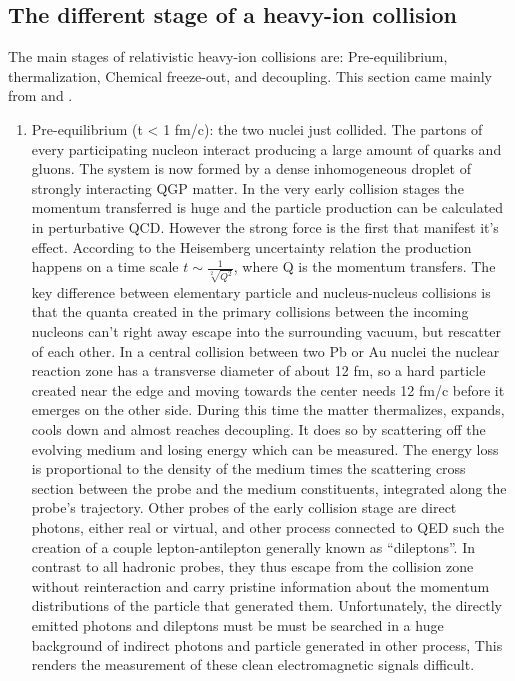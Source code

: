 \documentclass[12pt,a4paper]{book}
\begin{document}
	\subsection{The different stage of a heavy-ion collision}
	The main stages of relativistic heavy-ion collisions are: Pre-equilibrium, thermalization, Chemical freeze-out, and	decoupling. This section came mainly from \cite{heinz2004conceptsheavyionphysics} and \cite{amsdottorato9036}.
	\begin{enumerate}
		\item Pre-equilibrium (t < 1 fm/c): the two nuclei just collided. The partons of every participating nucleon interact producing a large amount of quarks and gluons. The system is now formed by a dense inhomogeneous droplet of strongly interacting QGP matter. In the very early collision stages the momentum transferred is huge and the particle production can be calculated in perturbative QCD. However the strong force is the first that manifest it's effect. According to the Heisemberg uncertainty relation the production happens on a time scale $t \sim \frac{1}{\sqrt[2]{Q^2}}$, where Q is the momentum transfers. The key difference between elementary particle and nucleus-nucleus collisions is that the quanta created in the primary collisions between the incoming nucleons can’t right away escape into the surrounding vacuum, but rescatter of each other. In a central collision between two Pb or Au nuclei the nuclear reaction zone has a transverse diameter of about 12 fm, so a hard particle created near the edge and moving towards the center needs 12 fm/c before it emerges on the other side. During this time the matter thermalizes, expands, cools down and almost reaches decoupling. It does so by scattering off the evolving medium and losing energy which can be measured. The energy loss is proportional to the density of the medium times the scattering cross section between the probe and the medium constituents, integrated along the probe’s trajectory. Other probes of the early collision stage are direct photons, either real or virtual, and other process connected to QED such the creation of a couple lepton-antilepton generally known as “dileptons”.  In contrast to all hadronic probes, they thus escape from the collision zone without reinteraction and carry pristine information about the momentum distributions of the particle that generated them. Unfortunately, the directly emitted photons and dileptons must be must be searched in a huge background of indirect photons and particle generated in other process, This renders the measurement of these clean electromagnetic signals difficult. %
		

\end{enumerate}
\end{document}
